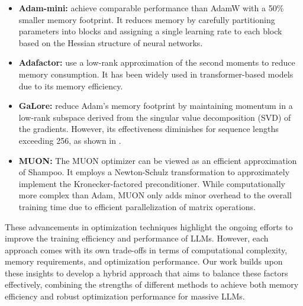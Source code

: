 \begin{itemize}

\item \textbf{Adam-mini:} \citet{zhang2024adam} achieve comparable performance than AdamW with a 50\% smaller memory footprint. It reduces memory by carefully partitioning parameters into blocks and assigning a single learning rate to each block based on the Hessian structure of neural networks. 

\item \textbf{Adafactor:} \citet{shazeer2018adafactor} use a low-rank approximation of the second moments to reduce memory consumption. It has been widely used in transformer-based models due to its memory efficiency.

\item \textbf{GaLore:} \citet{zhao2024galore} reduce Adam's memory footprint by maintaining momentum in a low-rank subspace derived from the singular value decomposition (SVD) of the gradients. However, its effectiveness diminishes for sequence lengths exceeding 256, as shown in \citet{liang2024memory}.

\item \textbf{MUON:} The MUON optimizer \citep{jordan2024MUON} can be viewed as an efficient approximation of Shampoo. It employs a Newton-Schulz transformation to approximately implement the Kronecker-factored preconditioner. While computationally more complex than Adam, MUON only adds minor overhead to the overall training time due to efficient parallelization of matrix operations.

\end{itemize}

These advancements in optimization techniques highlight the ongoing efforts to improve the training efficiency and performance of LLMs. However, each approach comes with its own trade-offs in terms of computational complexity, memory requirements, and optimization performance. Our work builds upon these insights to develop a hybrid approach that aims to balance these factors effectively, combining the strengths of different methods to achieve both memory efficiency and robust optimization performance for massive LLMs.
